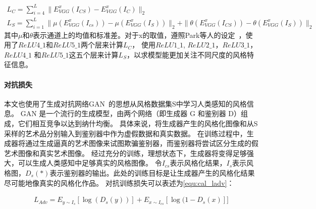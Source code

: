 \begin{equation}
    \label{equ:cal_perceptual_loss_cs}
    \begin{gathered}
        L_{C} = \sum_{i=4}^{L} \parallel E_{VGG}^{x}(I_{CS}) - E_{VGG}^{x}(I_{C}) \parallel_{2} \\
        L_{S} = \sum_{i=1}^{L} \parallel \mu(E_{VGG}^{x}(I_{cs})) - \mu(E_{VGG}^{x}(I_{S})) \parallel_{2} + \parallel \theta(E_{VGG}^{x}(I_{CS})) - \theta(E_{VGG}^{x}(I_{S})) \parallel_{2}
    \end{gathered}
\end{equation}
其中$\mu$和$\theta$表示通道上的均值和标准差。对于x的取值，遵照Park等人的设定~\cite{park2019arbitrary}，使用了$ReLU4\_1$和$ReLU5\_1$两个层来计算$L_C$，
使用$ReLU1\_1$, $ReLU2\_1$，$ReLU3\_1$，$ReLU4\_1$
和$ReLU5\_1$这五个层来计算$L_S$，以求模型能更加关注不同尺度的风格特征信息。

\paragraph{对抗损失}
\par 本文也使用了生成对抗网络GAN~\cite{goodfellow2020generative}的思想从风格数据集S中学习人类感知的风格信息。
GAN 是一个流行的生成模型，由两个网络（即生成器 G 和鉴别器 D）组成，它们相互竞争以达到纳什均衡。
具体来说，将生成器产生的风格化图像和从S采样的艺术品分别输入到鉴别器中作为虚假数据和真实数据。
在训练过程中，生成器将通过生成逼真的艺术图像来试图欺骗鉴别器，而鉴别器将尝试区分生成的假艺术图像和真实艺术图像。
经过充分的训练，理想状态下，生成器将变得足够强大，可以生成人类感知中足够真实的风格图像。
令$I_{cs}$表示风格化结果，$I_s$表示风格图，$D_s (*)$表示鉴别器的输出。此处的训练目标是让生成器产生的风格化结果尽可能地像真实的风格化作品。
对抗训练损失可以表述为\autoref{equ:cal_ladv}：

\begin{equation}
    \label{equ:cal_ladv}
    \begin{aligned}
    L_{Adv}=E_{y\sim I_s}[\log(D_s(y))]+E_{x\sim I_{cs}}[\log(1-D_s(x)]]
    \end{aligned}
\end{equation}
